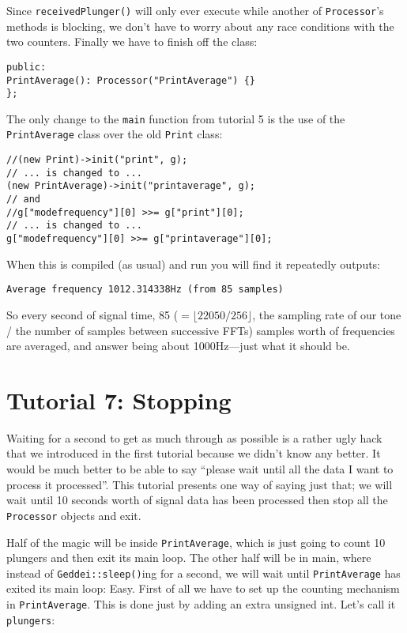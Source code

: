 Since \texttt{receivedPlunger()} will only ever execute while another of \texttt{Processor}'s methods is blocking, we don't have to worry about any race conditions with the two counters. Finally we have to finish off the class:

\begin{verbatim}
public:
PrintAverage(): Processor("PrintAverage") {}
};
\end{verbatim}

The only change to the \texttt{main} function from tutorial 5 is the use of the \texttt{PrintAverage} class over the old \texttt{Print} class:

\begin{verbatim}
//(new Print)->init("print", g);
// ... is changed to ...
(new PrintAverage)->init("printaverage", g);
// and
//g["modefrequency"][0] >>= g["print"][0];
// ... is changed to ...
g["modefrequency"][0] >>= g["printaverage"][0];
\end{verbatim}

When this is compiled (as usual) and run you will find it repeatedly outputs:

\begin{verbatim}
Average frequency 1012.314338Hz (from 85 samples)
\end{verbatim}

So every second of signal time, 85 ($= \lfloor22050 / 256\rfloor$, the sampling rate of our tone / the number of samples between successive FFTs) samples worth of frequencies are averaged, and answer being about 1000Hz---just what it should be.




\section{Tutorial 7: Stopping}

Waiting for a second to get as much through as possible is a rather ugly hack that we introduced in the first tutorial because we didn't know any better. It would be much better to be able to say ``please wait until all the data I want to process it processed''. This tutorial presents one way of saying just that; we will wait until 10 seconds worth of signal data has been processed then stop all the \texttt{Processor} objects and exit.

Half of the magic will be inside \texttt{PrintAverage}, which is just going to count 10 plungers and then exit its main loop. The other half will be in main, where instead of \texttt{Geddei::sleep()}ing for a second, we will wait until \texttt{PrintAverage} has exited its main loop: Easy. First of all we have to set up the counting mechanism in \texttt{PrintAverage}. This is done just by adding an extra unsigned int. Let's call it \texttt{plungers}:


